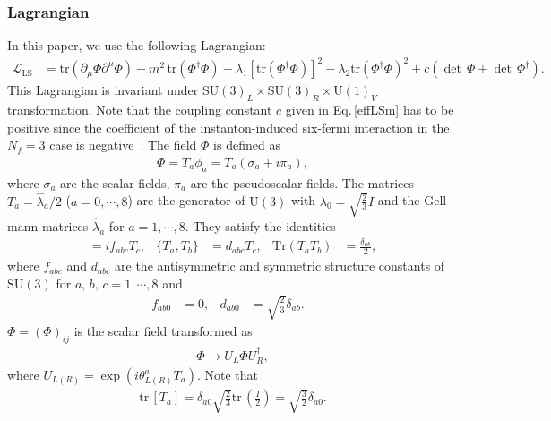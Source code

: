 \documentclass[a4paper,preprint,superscriptaddress,preprintnumbers,nofootinbib]{revtex4}
\newcommand{\SU}{\text{SU}}
\newcommand{\U}{\text{U}}
\newcommand{\al}[1]{\begin{align}#1\end{align}}
\newcommand{\p}{\partial}
\newcommand{\fn}[1]{\!\left(#1\right)}
\newcommand{\Lag}{\mathcal L}
\newcommand{\tr}{\text{tr}}
\begin{document}
\begin{appendix}
\subsubsection{Lagrangian}
In this paper, we use the following Lagrangian:
\al{
\Lag_\text{LS} &=\tr\left(\p_\mu \Phi \p^\mu \Phi \right)
-m^2\,\tr\left( \Phi^\dagger \Phi \right) -\lambda_1 \left[\tr\left( \Phi^\dagger \Phi\right) \right]^2 
-\lambda_2 \tr\left( \Phi^\dagger \Phi \right) ^2 +c \left( \det\, \Phi +\det\, \Phi^\dagger \right).
\label{effLSm}
}
This Lagrangian is invariant under $\SU\fn{3}_L\times \SU\fn{3}_R\times \U\fn{1}_V$ transformation.
Note that the coupling constant $c$ given in Eq.\,\eqref{effLSm} has to be positive since the coefficient of the instanton-induced six-fermi interaction in the $N_f=3$ case is negative~\cite{tHooft:1976snw,tHooft:1986ooh}.
The field $\Phi$ is defined as
\al{
\Phi =T_a \phi_a =T_a (\sigma_a+i\pi_a),
}
where $\sigma_a$ are the scalar fields, $\pi_a$ are the pseudoscalar fields.
The matrices $T_a=\hat \lambda_a/2$ ($a=0,\cdots, 8$) are the generator of $\U\fn{3}$ with $\lambda_0=\sqrt{\frac{2}{3}}I$ and the Gell-mann matrices $\hat \lambda_a$ for $a=1,\cdots, 8$.
They satisfy the identities 
\al{
[T_a,T_b]&=if_{abc}T_c,& 
\{ T_a, T_b\} &= d_{abc}T_c,&
\text{Tr}(T_aT_b)&=\frac{\delta_{ab}}{2},&
\label{matrixformula}
}
where $f_{abc}$ and $d_{abc}$ are the antisymmetric and symmetric structure constants of $\SU\fn{3}$ for $a,\, b,\, c=1,\cdots,8$ and 
\al{
f_{ab0}&=0,&d_{ab0}&=\sqrt{\frac{2}{3}}\delta_{ab}.&
}
$\Phi=(\Phi)_{ij}$ is the scalar field transformed as
\al{
\Phi \to U_L \Phi U_R^\dagger,
}
where $U_{L(R)} =\exp \fn{i\theta^a_{L(R)}T_a}$.
Note that 
\al{
\tr\,[T_a]=\delta_{a0}\sqrt{\frac{2}{3}}\tr\,\fn{\frac{I}{2}}=\sqrt{\frac{3}{2}}\delta_{a0}.
}


\end{appendix}
\end{document}
